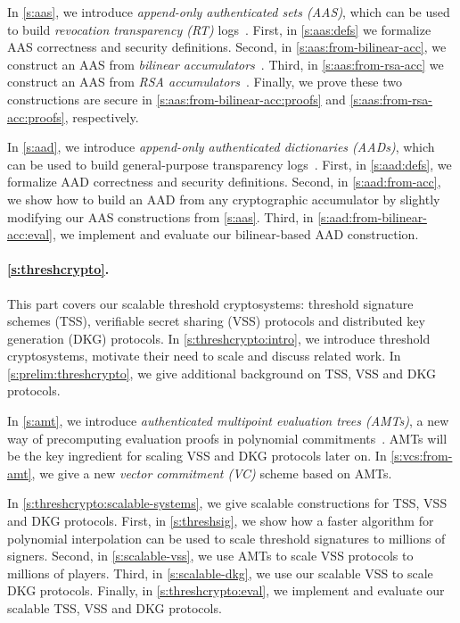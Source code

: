 In \cref{s:aas}, we introduce \textit{append-only authenticated sets (AAS)}, which can be used to build \textit{revocation transparency (RT)} logs~\cite{Laurie15}.
First, in \cref{s:aas:defs} we formalize AAS correctness and security definitions.
Second, in \cref{s:aas:from-bilinear-acc}, we construct an AAS from \textit{bilinear accumulators}~\cite{Nguyen05}.
Third,  in \cref{s:aas:from-rsa-acc} we construct an AAS from \textit{RSA accumulators}~\cite{acc-rsa}.
Finally, we prove these two constructions are secure in \cref{s:aas:from-bilinear-acc:proofs} and \cref{s:aas:from-rsa-acc:proofs}, respectively.

In \cref{s:aad}, we introduce \textit{append-only authenticated dictionaries (AADs)}, which can be used to build general-purpose transparency logs~\cite{ELC16,trillian}.
First, in \cref{s:aad:defs}, we formalize AAD correctness and security definitions.
Second, in \cref{s:aad:from-acc}, we show how to build an AAD from any cryptographic accumulator by slightly modifying our AAS constructions from \cref{s:aas}.
Third, in \cref{s:aad:from-bilinear-acc:eval}, we implement and evaluate our bilinear-based AAD construction.

\paragraph{\cref{s:threshcrypto}.}
This part covers our scalable threshold cryptosystems: threshold signature schemes (TSS), verifiable secret sharing (VSS) protocols and distributed key generation (DKG) protocols.
In \cref{s:threshcrypto:intro}, we introduce threshold cryptosystems, motivate their need to scale and discuss related work.
In \cref{s:prelim:threshcrypto}, we give additional background on TSS, VSS and DKG protocols.

In \cref{s:amt}, we introduce \textit{authenticated multipoint evaluation trees (AMTs)}, a new way of precomputing evaluation proofs in polynomial commitments~\cite{KZG10a}.
AMTs will be the key ingredient for scaling VSS and DKG protocols later on.
In \cref{s:vcs:from-amt}, we give a new \textit{vector commitment (VC)} scheme based on AMTs.

In \cref{s:threshcrypto:scalable-systems}, we give scalable constructions for TSS, VSS and DKG protocols.
First, in \cref{s:threshsig}, we show how a faster algorithm for polynomial interpolation can be used to scale threshold signatures to millions of signers.
Second, in \cref{s:scalable-vss}, we use AMTs to scale VSS protocols to millions of players.
Third, in \cref{s:scalable-dkg}, we use our scalable VSS to scale DKG protocols.
Finally, in \cref{s:threshcrypto:eval}, we implement and evaluate our scalable TSS, VSS and DKG protocols.


